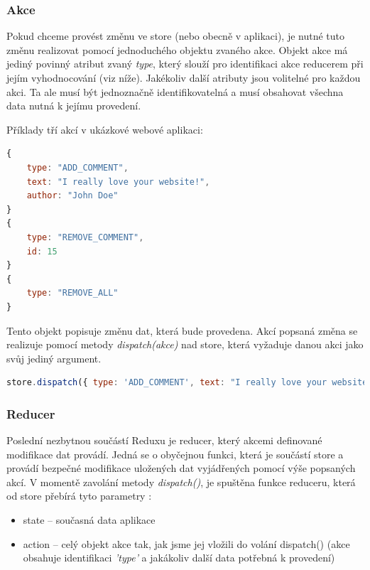 \subsubsection{Akce}
Pokud chceme provést změnu ve store (nebo obecně v aplikaci), je nutné tuto změnu realizovat pomocí jednoduchého objektu zvaného akce. Objekt akce má jediný povinný atribut zvaný \textit{type}, který slouží pro identifikaci akce reducerem při jejím vyhodnocování (viz níže). Jakékoliv další atributy jsou volitelné pro každou akci. Ta ale musí být jednoznačně identifikovatelná a musí obsahovat všechna data nutná k jejímu provedení.

\pagebreak
\noindent Příklady tří akcí v ukázkové webové aplikaci:
\begin{lstlisting}[language=Javascript, caption={Ukázka několika Redux akcí}]
{
    type: "ADD_COMMENT",
    text: "I really love your website!",
    author: "John Doe"
}
{
    type: "REMOVE_COMMENT",
    id: 15
}
{
    type: "REMOVE_ALL"
}
\end{lstlisting}

Tento objekt popisuje změnu dat, která bude provedena. Akcí popsaná změna se realizuje pomocí metody \textit{dispatch(akce)} nad store, která vyžaduje danou akci jako svůj jediný argument.

\begin{lstlisting}[language=Javascript, caption={Ukázka volání akce na Redux store}]
store.dispatch({ type: 'ADD_COMMENT', text: "I really love your website!", author: "John Doe" });
\end{lstlisting}

\subsubsection{Reducer}
Poslední nezbytnou součástí Reduxu je reducer, který akcemi definované modifikace dat provádí. Jedná se o obyčejnou funkci, která je součástí store a provádí bezpečné modifikace uložených dat vyjádřených pomocí výše popsaných akcí. V momentě zavolání metody \textit{dispatch()}, je spuštěna funkce reduceru, která od store přebírá tyto parametry \cite{redux}:
\begin{itemize}
\item state – současná data aplikace
\item action – celý objekt akce tak, jak jsme jej vložili do volání dispatch() (akce obsahuje identifikaci \textit{'type'} a jakákoliv další data potřebná k provedení)
\end{itemize}

